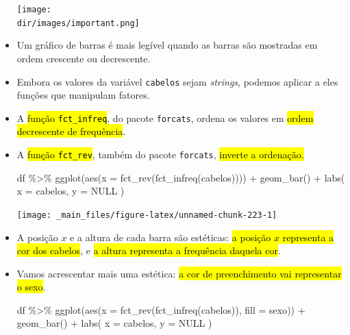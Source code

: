 \documentclass[
  11pt]{report}
\newenvironment{Shaded}{\begin{snugshade}}{\end{snugshade}}
\newcommand{\AttributeTok}[1]{\textcolor[rgb]{0.77,0.63,0.00}{#1}}
\newcommand{\ConstantTok}[1]{\textcolor[rgb]{0.00,0.00,0.00}{#1}}
\newcommand{\FunctionTok}[1]{\textcolor[rgb]{0.00,0.00,0.00}{#1}}
\newcommand{\NormalTok}[1]{#1}
\newcommand{\SpecialCharTok}[1]{\textcolor[rgb]{0.00,0.00,0.00}{#1}}
\newcommand{\StringTok}[1]{\textcolor[rgb]{0.31,0.60,0.02}{#1}}
\newcommand{\dir}{/ssd/R/x86_64-pc-linux-gnu-library/4.3/fnaufelRmd/rmarkdown/resources}
\newenvironment{rmdimportant}
{
  \begin{myimportant}
    \texttt{[image: \\dir/images/important.png]}
    \tcblower
  }
  {
  \end{myimportant}
}
\renewenvironment{Shaded}{
    \begin{mdframed}[%
      roundcorner=2pt,%
      innerleftmargin=5pt,%
      innerrightmargin=5pt,%
      topline=true,%
      leftline=true,%
      rightline=true,%
      bottomline=true,%
      linewidth=0.5pt,%
      linecolor=black!20,%
      backgroundcolor=black!2,%
      skipabove=2ex,%
      skipbelow=2.5ex%
    ]%
  }
  {
    \end{mdframed}
  }
\begin{document}
\begin{itemize}
\begin{rmdimportant}
  \end{rmdimportant}
\item
  Um gráfico de barras é mais legível quando as barras são mostradas em ordem crescente ou decrescente.
\item
  Embora os valores da variável \texttt{cabelos} sejam \emph{strings}, podemos aplicar a eles funções que manipulam fatores.
\item
  A {\hl{função {\mbox{\texttt{fct\_infreq}}}}}, do pacote \texttt{forcats}, ordena os valores em {\hl{ordem decrescente de frequência}}.
\item
  A {\hl{função {\mbox{\texttt{fct\_rev}}}}}, também do pacote \texttt{forcats}, {\hl{inverte a ordenação.}}

\begin{Shaded}
\begin{Highlighting}[]
\NormalTok{df }\SpecialCharTok{\%\textgreater{}\%} 
  \FunctionTok{ggplot}\NormalTok{(}\FunctionTok{aes}\NormalTok{(}\AttributeTok{x =} \FunctionTok{fct\_rev}\NormalTok{(}\FunctionTok{fct\_infreq}\NormalTok{(cabelos)))) }\SpecialCharTok{+}
    \FunctionTok{geom\_bar}\NormalTok{() }\SpecialCharTok{+}
    \FunctionTok{labs}\NormalTok{(}
      \AttributeTok{x =} \StringTok{\textquotesingle{}cabelos\textquotesingle{}}\NormalTok{,}
      \AttributeTok{y =} \ConstantTok{NULL}
\NormalTok{    )}
\end{Highlighting}
\end{Shaded}

  \begin{center}\texttt{[image: \_main\_files/figure-latex/unnamed-chunk-223-1]} \end{center}
\item
  A posição $x$ e a altura de cada barra são estéticas: {\hl{a posição $x$ representa a cor dos cabelos}}, e {\hl{a altura representa a frequência daquela cor}}.
\item
  Vamos acrescentar mais uma estética: {\hl{a cor de preenchimento vai representar o sexo}}.

\begin{Shaded}
\begin{Highlighting}[]
\NormalTok{df }\SpecialCharTok{\%\textgreater{}\%} 
  \FunctionTok{ggplot}\NormalTok{(}\FunctionTok{aes}\NormalTok{(}\AttributeTok{x =} \FunctionTok{fct\_rev}\NormalTok{(}\FunctionTok{fct\_infreq}\NormalTok{(cabelos)), }\AttributeTok{fill =}\NormalTok{ sexo)) }\SpecialCharTok{+}
    \FunctionTok{geom\_bar}\NormalTok{() }\SpecialCharTok{+}
    \FunctionTok{labs}\NormalTok{(}
      \AttributeTok{x =} \StringTok{\textquotesingle{}cabelos\textquotesingle{}}\NormalTok{,}
      \AttributeTok{y =} \ConstantTok{NULL}
\NormalTok{    )}
\end{Highlighting}
\end{Shaded}


\end{itemize}
\end{document}
